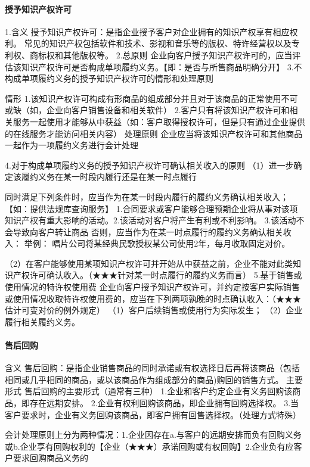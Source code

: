 \documentclass[UTF8,12pt]{ctexart}
\numberwithin{equation}{section} %
\numberwithin{figure}{section}
\numberwithin{table}{section}
\begin{document}
	
	
	\paragraph{授予知识产权许可}
	1.含义
	授予知识产权许可：是指企业授予客户对企业拥有的知识产权享有相应权利。
	常见的知识产权包括软件和技术、影视和音乐等的版权、特许经营权以及专利权、商标权和其他版权等。
	2.总原则
	企业向客户授予知识产权许可的，应当评估该知识产权许可是否构成单项履约义务。【即：是否与所售商品明确分开】
	3.不构成单项履约义务的授予知识产权许可的情形和处理原则
	
	情形	1.该知识产权许可构成有形商品的组成部分并且对于该商品的正常使用不可或缺（如，企业向客户销售设备和相关软件）
	2.客户只有将该知识产权许可和相关服务一起使用才能够从中获益（如：客户取得授权许可，但是只有通过企业提供的在线服务才能访问相关内容）
	处理原则	企业应当将该知识产权许可和其他商品一起作为一项履约义务进行会计处理
	
	4.对于构成单项履约义务的授予知识产权许可确认相关收入的原则
	（1）进一步确定该履约义务在某一时段内履行还是在某一时点履行
	
	同时满足下列条件时，应当作为在某一时段内履行的履约义务确认相关收入；【如：提供法规库查询服务】
	1.合同要求或客户能够合理预期企业将从事对该项知识产权有重大影响的活动。2.该活动对客户将产生有利或不利影响。
	3.该活动不会导致向客户转让商品	否则，应当作为在某一时点履行的履约义务确认相关收入：
	举例：
	唱片公司将某经典民歌授权某公司使用2年，每月收取固定对价。
	
	（2）在客户能够使用某项知识产权许可并开始从中获益之前，企业不能对此类知识产权许可确认收入。（★★★针对某一时点履行的履约义务而言）
	5.基于销售或使用情况的特许权使用费
	企业向客户授予知识产权许可，并约定按客户实际销售或使用情况收取特许权使用费的，应当在下列两项孰晚的时点确认收入：（★★★估计可变对价的例外规定）
	（1）客户后续销售或使用行为实际发生；
	（2）企业履行相关履约义务。
	
	\paragraph{售后回购}
	含义	售后回购：是指企业销售商品的同时承诺或有权选择日后再将该商品（包括相同或几乎相同的商品，或以该商品作为组成部分的商品)购回的销售方式。
	主要形式	售后回购的主要形式（通常有三种）
	1.企业和客户约定企业有义务回购该商品，即存在远期安排。
	2.企业有权利回购该商品，即企业拥有回购选择权。
	3.当客户要求时，企业有义务回购该商品，即客户拥有回售选择权。（处理方式特殊）
	
	会计处理原则上分为两种情况：1.企业因存在a.与客户的远期安排而负有回购义务或b.企业享有回购权利的【企业（★★★）承诺回购或有权回购】2.企业负有应客户要求回购商品义务的
	
\end{document}
